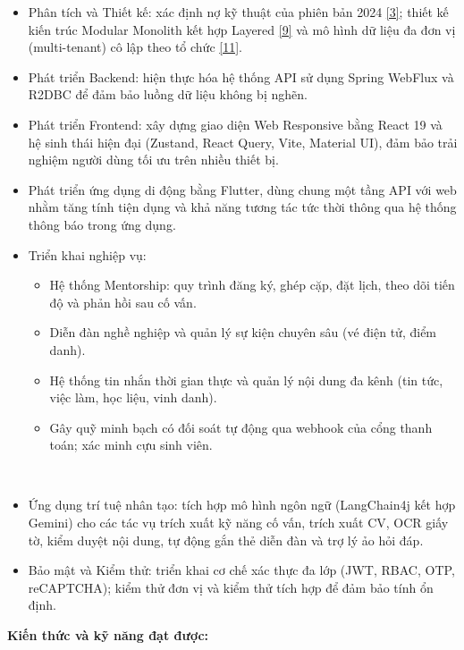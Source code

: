 \documentclass[12pt,a4paper]{article}
\begin{document}
\begin{itemize}
    \item Phân tích và Thiết kế: xác định nợ kỹ thuật của phiên bản 2024 \hyperref[ref:alumverse]{[3]}; thiết kế kiến trúc Modular Monolith kết hợp Layered \hyperref[ref:poeaa]{[9]} và mô hình dữ liệu đa đơn vị (multi-tenant) cô lập theo tổ chức \hyperref[ref:multitenant]{[11]}.
    \item Phát triển Backend: hiện thực hóa hệ thống API sử dụng Spring WebFlux và R2DBC để đảm bảo luồng dữ liệu không bị nghẽn.
    \item Phát triển Frontend: xây dựng giao diện Web Responsive bằng React 19 và hệ sinh thái hiện đại (Zustand, React Query, Vite, Material UI), đảm bảo trải nghiệm người dùng tối ưu trên nhiều thiết bị.
    \item Phát triển ứng dụng di động bằng Flutter, dùng chung một tầng API với web nhằm tăng tính tiện dụng và khả năng tương tác tức thời thông qua hệ thống thông báo trong ứng dụng.
    \item Triển khai nghiệp vụ:
    \begin{itemize}
        \item Hệ thống Mentorship: quy trình đăng ký, ghép cặp, đặt lịch, theo dõi tiến độ và phản hồi sau cố vấn.
        \item Diễn đàn nghề nghiệp và quản lý sự kiện chuyên sâu (vé điện tử, điểm danh).
        \item Hệ thống tin nhắn thời gian thực và quản lý nội dung đa kênh (tin tức, việc làm, học liệu, vinh danh).
        \item Gây quỹ minh bạch có đối soát tự động qua webhook của cổng thanh toán; xác minh cựu sinh viên.
    \end{itemize}
    \item Ứng dụng trí tuệ nhân tạo: tích hợp mô hình ngôn ngữ (LangChain4j kết hợp Gemini) cho các tác vụ trích xuất kỹ năng cố vấn, trích xuất CV, OCR giấy tờ, kiểm duyệt nội dung, tự động gắn thẻ diễn đàn và trợ lý ảo hỏi đáp.
    \item Bảo mật và Kiểm thử: triển khai cơ chế xác thực đa lớp (JWT, RBAC, OTP, reCAPTCHA); kiểm thử đơn vị và kiểm thử tích hợp để đảm bảo tính ổn định.
\end{itemize}
\textbf{Kiến thức và kỹ năng đạt được:}
\vspace{-8pt}
\end{document}

